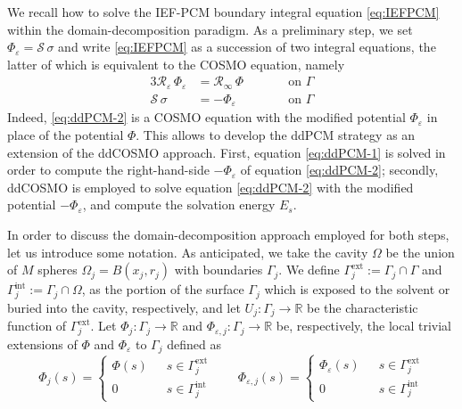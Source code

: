 \documentclass[aip,jcp,a4paper,11pt]{revtex4-1}
\newcommand{\cS}{\mathcal{S}}
\newcommand{\cR}{\mathcal{R}}
\begin{document}
We recall how to solve the IEF-PCM boundary integral equation \eqref{eq:IEFPCM} within the domain-decomposition paradigm. As a preliminary step, we set $\Phi_\varepsilon = \cS \, \sigma$ and write \eqref{eq:IEFPCM} as a succession of two integral equations, the latter of which is equivalent to the COSMO equation\cite{Cances_Librone_PCM}, namely
\begin{alignat}{3}
\cR_\varepsilon \, \Phi_\varepsilon & = \cR_\infty \, \Phi \qquad && \text{on }\Gamma  \label{eq:ddPCM-1} \\
\cS \, \sigma & = -\Phi_\varepsilon  && \text{on }\Gamma \label{eq:ddPCM-2} 
\end{alignat}
Indeed, \eqref{eq:ddPCM-2} is a COSMO equation with the modified potential $\Phi_\varepsilon$ in place of the potential $\Phi$. This allows to develop the ddPCM strategy as an extension of the ddCOSMO approach. First, equation \eqref{eq:ddPCM-1} is solved in order to compute the right-hand-side $-\Phi_\varepsilon$ of equation \eqref{eq:ddPCM-2}; secondly, ddCOSMO is employed to solve equation \eqref{eq:ddPCM-2} with the modified potential $-\Phi_\varepsilon$, and compute the solvation energy $E_s$.


In order to discuss the domain-decomposition approach employed for both steps, let us introduce some notation. As anticipated, we take the cavity $\Omega$ be the union of $M$ spheres $\Omega_j = B(x_j, r_j)$ with boundaries $\Gamma_j$. We define $\Gamma_j^\text{ext}:= \Gamma_j \cap \Gamma$ and $\Gamma_j^\text{int} := \Gamma_j \cap \Omega$, as the portion of the surface $\Gamma_j$ which is exposed to the solvent or buried into the cavity, respectively, and let $U_j: \Gamma_j \to \mathbb{R}$ be the characteristic function of $\Gamma_j^\text{ext}$. Let $\Phi_j : \Gamma_j \to \mathbb{R}$ and $\Phi_{\varepsilon,j} : \Gamma_j \to \mathbb{R}$ be, respectively, the local trivial extensions of $\Phi$ and $\Phi_\varepsilon$ to $\Gamma_j$ defined as
\begin{equation}
 \label{eq:trivial_ext}
 \Phi_j(s) = 
 \begin{cases}
  \Phi(s) \phantom{0} \quad s \in \Gamma_j^\text{ext}\\
  0 \phantom{\Phi(s)} \quad s \in \Gamma_j^\text{int}
 \end{cases}
\qquad
\Phi_{\varepsilon,j}(s) = 
 \begin{cases}
  \Phi_{\varepsilon}(s) \phantom{0} \quad s \in \Gamma_j^\text{ext}\\
  0 \phantom{\Phi(s)_{\varepsilon}} \quad s \in \Gamma_j^\text{int}
 \end{cases}
\end{equation}
\end{document}

